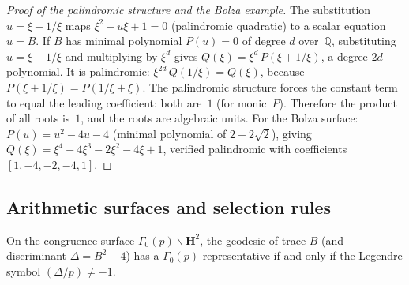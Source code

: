 \begin{proof}[Proof of the palindromic structure and the Bolza example]
The substitution $u = \xi + 1/\xi$ maps $\xi^2 - u\xi + 1 = 0$
(palindromic quadratic) to a scalar equation $u = B$.
If $B$ has minimal polynomial $P(u) = 0$ of degree $d$
over~$\mathbb{Q}$, substituting $u = \xi + 1/\xi$ and
multiplying by $\xi^d$ gives $Q(\xi) = \xi^d\,P(\xi + 1/\xi)$,
a degree-$2d$ polynomial.
It is palindromic: $\xi^{2d}\,Q(1/\xi) = Q(\xi)$, because
$P(\xi + 1/\xi) = P(1/\xi + \xi)$.
The palindromic structure forces the constant term to equal
the leading coefficient: both are~$1$ (for monic~$P$).
Therefore the product of all roots is~$1$,
and the roots are algebraic units.
For the Bolza surface: $P(u) = u^2 - 4u - 4$
(minimal polynomial of $2 + 2\sqrt{2}$), giving
$Q(\xi) = \xi^4 - 4\xi^3 - 2\xi^2 - 4\xi + 1$, verified
palindromic with coefficients $[1, -4, -2, -4, 1]$.
\end{proof}

\subsection{Arithmetic surfaces and selection rules}
On the congruence surface $\Gamma_0(p)\backslash\mathbf{H}^2$,
the geodesic of trace $B$ (and discriminant
$\Delta = B^2 - 4$) has a $\Gamma_0(p)$-representative if and
only if the Legendre symbol $(\Delta/p) \ne -1$.

